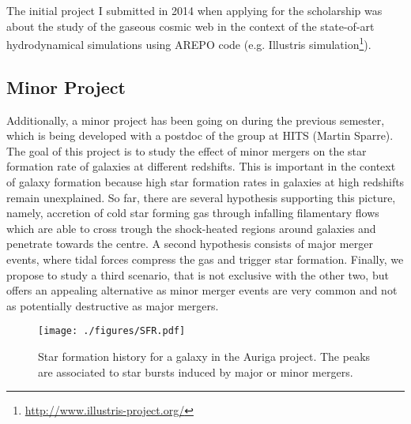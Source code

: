 \documentclass[a4,useAMS,usenatbib,usegraphicx,12pt]{article}
\begin{document}
The initial project I submitted in 2014 when applying for the scholarship was
about the study of the gaseous cosmic web in the context of the state-of-art 
hydrodynamical simulations using AREPO code (e.g. Illustris simulation\footnote{
\url{http://www.illustris-project.org/}}).



\subsection{Minor Project}

Additionally, a minor project has been going on during the previous semester, 
which is being developed with a postdoc of the group at HITS (Martin Sparre).
The goal of this project is to study the effect of minor mergers on the
star formation rate of galaxies at different redshifts. This is important in
the context of galaxy formation because high star formation rates in galaxies 
at high redshifts remain unexplained. So far, there are several hypothesis 
supporting this picture, namely, accretion of cold star forming gas through 
infalling filamentary flows which are able to cross trough the shock-heated 
regions around galaxies and penetrate towards the centre. A second hypothesis 
consists of major merger events, where tidal forces compress the gas and 
trigger star formation. Finally, we propose to study a third scenario, that is 
not exclusive with the other two, but offers an appealing alternative as minor 
merger events are very common and not as potentially destructive as major 
mergers.

\begin{figure}[!htbp]
\centering

  \texttt{[image: ./figures/SFR.pdf]}
  
  \caption{\small Star formation history for a galaxy in the Auriga project.
  The peaks are associated to star bursts induced by major or minor mergers.}

  \label{fig:SFR}

\end{figure}
\end{document}
